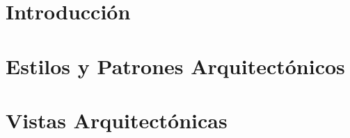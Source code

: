 \renewcommand{\contentsname}{Contenido}
\tableofcontents
\newpage

\section{Introducción}
\label{sec:intro}


\section{Estilos y Patrones Arquitectónicos}
\label{sec:epa}


\section{Vistas Arquitectónicas}\label{sec:va}
